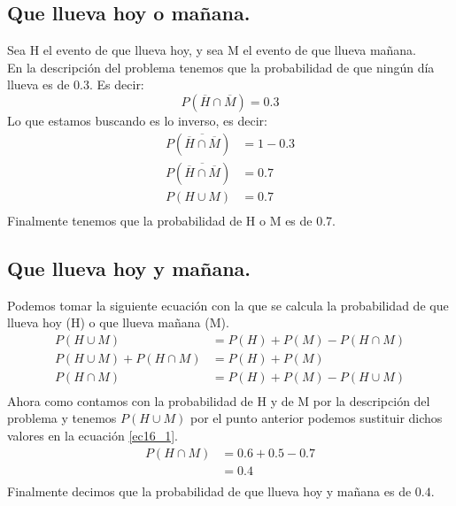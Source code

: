 \documentclass[12pt]{article}
\begin{document}
\subsection{Que llueva hoy o mañana.}
Sea H el evento de que llueva hoy, y sea M el evento de que llueva mañana.\\
En la descripción del problema tenemos que la probabilidad de que ningún día llueva es de 0.3. Es decir:
\begin{equation}
	P(\overline{H} \cap \overline{M}) = 0.3
\end{equation}
Lo que estamos buscando es lo inverso, es decir:
\begin{equation}
\begin{split}
P(\overline{\overline{H} \cap \overline{M}}) &= 1 - 0.3 \\
P(\overline{\overline{H} \cap \overline{M}}) &= 0.7 \\
P(H \cup M) &= 0.7 \\
\end{split}
\end{equation}
Finalmente tenemos que la probabilidad de H o M es de 0.7.
\subsection{Que llueva hoy y mañana.}
Podemos tomar la siguiente ecuación con la que se calcula la probabilidad de que llueva hoy (H) o que llueva mañana (M).\\
\begin{equation}\label{ec16_1}
	\begin{split}
		P(H\cup M) &= P(H) + P(M) - P(H\cap M)\\
		P(H\cup M) + P(H\cap M) &= P(H) + P(M)\\
		P(H\cap M) &= P(H) + P(M) - P(H\cup M)\\
	\end{split}
\end{equation}
Ahora como contamos con la probabilidad de H y de M por la descripción del problema y tenemos $P(H\cup M)$ por el punto anterior podemos sustituir dichos valores en la ecuación \ref{ec16_1}.
\begin{equation}\label{ec16_2}
\begin{split}
P(H\cap M) &= 0.6 + 0.5 - 0.7\\
&= 0.4\\
\end{split}
\end{equation}
Finalmente decimos que la probabilidad de que llueva hoy y mañana es de $0.4$.
\end{document}
